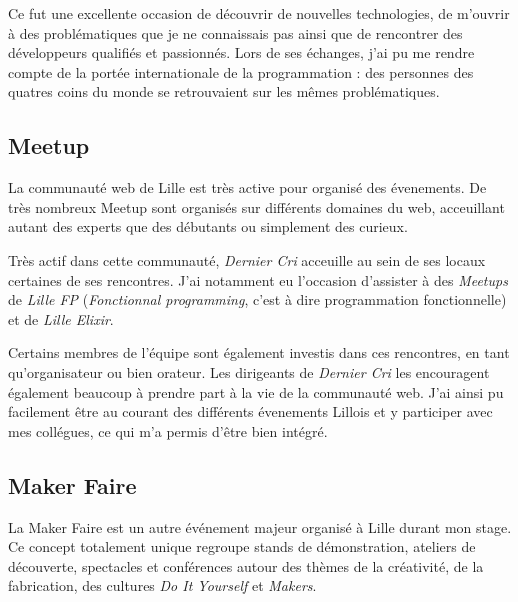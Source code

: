 \documentclass[12pt,a4paper]{article}
\begin{document}
  \bigskip

  Ce fut une excellente occasion de découvrir de nouvelles technologies,
  de m'ouvrir à des problématiques que je ne connaissais pas ainsi que de
  rencontrer des développeurs qualifiés et passionnés. Lors de ses
  échanges, j'ai pu me rendre compte de la portée internationale de la
  programmation : des personnes des quatres coins du monde se retrouvaient
  sur les mêmes problématiques.

  \bigskip

  \subsection{Meetup}\label{meetup}

  \bigskip

  La communauté web de Lille est très active pour organisé des évenements.
  De très nombreux Meetup sont organisés sur différents domaines du web,
  acceuillant autant des experts que des débutants ou simplement des
  curieux.

  \bigskip

  Très actif dans cette communauté, \emph{Dernier Cri} acceuille au sein
  de ses locaux certaines de ses rencontres. J'ai notamment eu l'occasion
  d'assister à des \emph{Meetups} de \emph{Lille FP} (\emph{Fonctionnal
  programming}, c'est à dire programmation fonctionnelle) et de
  \emph{Lille Elixir}.

  \bigskip

  Certains membres de l'équipe sont également investis dans ces
  rencontres, en tant qu'organisateur ou bien orateur. Les dirigeants de
  \emph{Dernier Cri} les encouragent également beaucoup à prendre part à
  la vie de la communauté web. J'ai ainsi pu facilement être au courant
  des différents évenements Lillois et y participer avec mes collégues, ce
  qui m'a permis d'être bien intégré.

  \bigskip

  \subsection{Maker Faire}\label{maker-faire}

  \bigskip

  La Maker Faire est un autre événement majeur organisé à Lille durant mon
  stage. Ce concept totalement unique regroupe stands de démonstration,
  ateliers de découverte, spectacles et conférences autour des thèmes de
  la créativité, de la fabrication, des cultures \emph{Do It Yourself} et
  \emph{Makers}.
\end{document}

